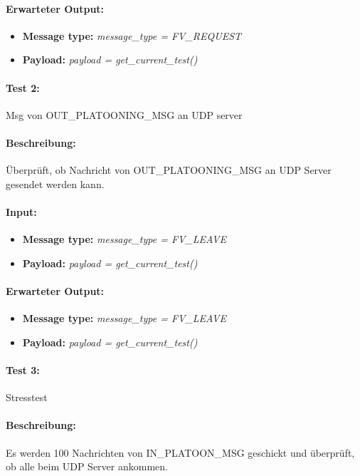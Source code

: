 \documentclass[a4paper, 12pt, titlepage]{scrartcl}
\begin{document}
{			\paragraph{Erwarteter Output:}
			\begin{itemize} \itemsep-0.5em
				\item \textbf{Message type:} \emph{message\_type = FV\_REQUEST}
				\item \textbf{Payload:} \emph{payload = get\_current\_test()}
			\end{itemize}
			
			\paragraph{Test 2:}{Msg von OUT\_PLATOONING\_MSG an UDP server}
			\paragraph{Beschreibung:} Überprüft, ob Nachricht von OUT\_PLATOONING\_MSG an UDP Server gesendet werden kann.
			\paragraph{Input:}
			\begin{itemize} \itemsep-0.5em
				\item \textbf{Message type:} \emph{message\_type = FV\_LEAVE}
				\item \textbf{Payload:} \emph{payload = get\_current\_test()}
			\end{itemize}
			\paragraph{Erwarteter Output:}
			\begin{itemize} \itemsep-0.5em
				\item \textbf{Message type:} \emph{message\_type = FV\_LEAVE}
				\item \textbf{Payload:} \emph{payload = get\_current\_test()}
			\end{itemize}						
			
			\paragraph{Test 3:}{Stresstest}
			\paragraph{Beschreibung:} Es werden 100 Nachrichten von IN\_PLATOON\_MSG geschickt 	und überprüft, ob alle beim UDP Server ankommen.
}
\end{document}
